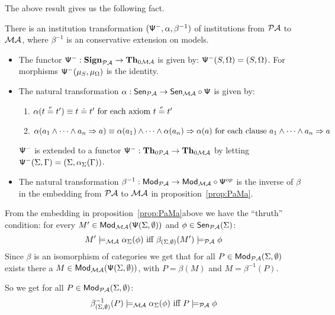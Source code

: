 \documentclass[10pt]{article}
\begin{document}
The above result gives us the following fact.
\begin{proposition}\label{prop:PaMaT}
There is an institution transformation $({\sf {\Psi}}^-,\alpha, \beta^{-1})$ of institutions from
${\mathcal{PA}}$ to ${\mathcal{MA}}$, where $\beta^{-1}$ is an conservative extension on models.
\end{proposition}
%
\begin{PROOF}
\begin{itemize}
\item The functor ${\sf {\Psi}}^-: {\bf Sign}_{{\mathcal{PA}}} \to {\bf Th}_{0{\mathcal{MA}}}$ is given
by: ${\sf {\Psi}}^-(S,\Omega)= (S,\Omega)$. For  morphisms
${\sf {\Psi}}^-(\mu_S,\mu_{\Omega})$ is the identity.  
\item The natural transformation
$\alpha: {\sf {Sen}}_{{\mathcal{PA}}} \to {\sf {Sen}}_{{\mathcal{MA}}} \circ {\sf {\Psi}}$ is given by:
   \begin{enumerate} 
    \item $\alpha(t \stackrel{e}{=} t') \equiv t \mathrel{\dot{=} } t'\mbox{ for
each axiom }t \stackrel{e}{=} t'$ 
    \item $\alpha(a_1 \wedge \cdots \wedge a_n
\Rightarrow a) \equiv \alpha(a_1) \wedge \cdots \wedge \alpha(a_n)
\Rightarrow \alpha(a)\mbox{ for each clause }a_1 \wedge \cdots \wedge
a_n \Rightarrow a$ 
   \end{enumerate}
${\sf {\Psi}}^-$ is extended to a functor 
${\sf {\Psi}}^-: {\bf Th}_{0{\mathcal{PA}}} \to {\bf Th}_{0{\mathcal{MA}}}$ by letting
${\sf {\Psi}}^-(\Sigma,\Gamma) = (\Sigma,\alpha_\Sigma(\Gamma))$.
%
\item The natural transformation $\beta^{-1}: {\sf {Mod}}_{{\mathcal{PA}}} \to
{\sf {Mod}}_{{\mathcal{MA}}} \circ {\sf {\Psi}}^{op}$ is the inverse of $\beta$ in the embedding from ${\mathcal{PA}}$ to ${\mathcal{MA}}$ in proposition~\ref{prop:PaMa}.
\end{itemize}

From the embedding in proposition~\ref{prop:PaMa}above we have the ``thruth'' condition: for every $M'\in{\sf {Mod}}_{{\mathcal{MA}}}({\sf {\Psi}}(\Sigma,\emptyset))$ and $\phi \in {\sf {Sen}}_{{\mathcal{PA}}}(\Sigma)$:
\begin{equation}
\label{eq:tcpZ} 
M' \models_{{\mathcal{MA}}} \alpha_{\Sigma}(\phi) \mbox{ iff } 
\beta_{(\Sigma,\emptyset)} (M') \models_{{\mathcal{PA}}} \phi  
\end{equation}
Since $\beta$ is an isomorphism of categories we get that for all $P \in{\sf {Mod}}_{{\mathcal{PA}}}(\Sigma,\emptyset)$ exists there a $M \in{\sf {Mod}}_{{\mathcal{MA}}}({\sf {\Psi}}(\Sigma,\emptyset))$, with $P = \beta(M)$ and $M = \beta^{-1}(P)$. 

So we get for all $P \in {\sf {Mod}}_{{\mathcal{PA}}}(\Sigma,\emptyset)$:
\begin{equation}
\label{eq:tcp1} 
\beta^{-1}_{(\Sigma,\emptyset)} (P) \models_{{\mathcal{MA}}} \alpha_{\Sigma}(\phi) \mbox{ iff } 
P \models_{{\mathcal{PA}}} \phi  
\end{equation}
\end{PROOF}
\end{document}
